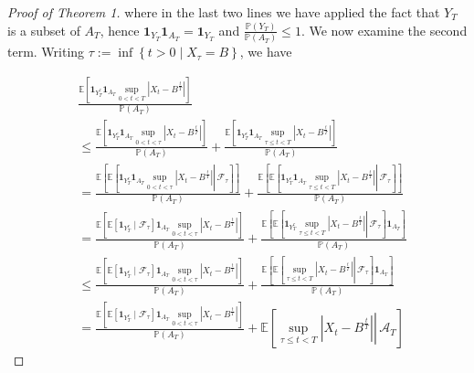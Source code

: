 \documentclass{article}
\theoremstyle{definition}
\theoremstyle{definition}
\begin{document}
\begin{proof}[Proof of Theorem 1]
where in the last two lines we have applied the fact that $Y_{T}$ is a subset of $A_{T}$, hence $\mathbf{1}_{Y_{T}} \mathbf{1}_{A_{T}}=\mathbf{1}_{Y_{T}}$ and $\frac{\mathbb{P}\left(Y_{T}\right)}{\mathbb{P}\left(A_{T}\right)} \leq 1$. We now examine the second term. Writing $\tau:=\inf \left\{t>0 \mid X_{\tau}=B\right\}$, we have

\begin{equation}\label{lol}\begin{aligned}
& \frac{\mathbb{E}\left[\mathbf{1}_{Y_{T}^{c}} \mathbf{1}_{A_{T}} \sup _{0<t<T}\left|X_{t}-B^{\frac{t}{T}}\right|\right]}{\mathbb{P}\left(A_{T}\right)} \\
& \leq \frac{\mathbb{E}\left[\mathbf{1}_{Y_{T}^{c}} \mathbf{1}_{A_{T}} \sup _{0<t<\tau}\left|X_{t}-B^{\frac{t}{T}}\right|\right]}{\mathbb{P}\left(A_{T}\right)}+\frac{\mathbb{E}\left[\mathbf{1}_{Y_{T}^{c}} \mathbf{1}_{A_{T}} \sup _{\tau \leq t<T}\left|X_{t}-B^{\frac{t}{T}}\right|\right]}{\mathbb{P}\left(A_{T}\right)} \\
& =\frac{\mathbb{E}\left[\mathbb{E}\left[\left.\mathbf{1}_{Y_{T}^{c}} \mathbf{1}_{A_{T}} \sup _{0<t<\tau}\left|X_{t}-B^{\frac{t}{T}}\right| \right\rvert\, \mathcal{F}_{\tau}\right]\right]}{\mathbb{P}\left(A_{T}\right)}+\frac{\mathbb{E}\left[\mathbb{E}\left[\left.\mathbf{1}_{Y_{T}^{c}} \mathbf{1}_{A_{T}} \sup _{\tau \leq t<T}\left|X_{t}-B^{\frac{t}{T}}\right| \right\rvert\, \mathcal{F}_{\tau}\right]\right]}{\mathbb{P}\left(A_{T}\right)} \\
& =\frac{\mathbb{E}\left[\mathbb{E}\left[\mathbf{1}_{Y_{T}^{c}} \mid \mathcal{F}_{\tau}\right] \mathbf{1}_{A_{T}} \sup _{0<t<\tau}\left|X_{t}-B^{\frac{t}{T}}\right|\right]}{\mathbb{P}\left(A_{T}\right)}+\frac{\mathbb{E}\left[\mathbb{E}\left[\left.\mathbf{1}_{Y_{T}^{c}} \sup _{\tau \leq t<T}\left|X_{t}-B^{\frac{t}{T}}\right| \right\rvert\, \mathcal{F}_{\tau}\right] \mathbf{1}_{A_{T}}\right]}{\mathbb{P}\left(A_{T}\right)} \\
& \leq \frac{\mathbb{E}\left[\mathbb{E}\left[\mathbf{1}_{Y_{T}^{c}} \mid \mathcal{F}_{\tau}\right] \mathbf{1}_{A_{T}} \sup _{0<t<\tau}\left|X_{t}-B^{\frac{t}{T}}\right|\right]}{\mathbb{P}\left(A_{T}\right)}+\frac{\mathbb{E}\left[\mathbb{E}\left[\left.\sup _{\tau \leq t<T}\left|X_{t}-B^{\frac{t}{T}}\right| \right\rvert\, \mathcal{F}_{\tau}\right] \mathbf{1}_{A_{T}}\right]}{\mathbb{P}\left(A_{T}\right)} \\
& =\frac{\mathbb{E}\left[\mathbb{E}\left[\mathbf{1}_{Y_{T}^{c}} \mid \mathcal{F}_{\tau}\right] \mathbf{1}_{A_{T}} \sup _{0<t<\tau}\left|X_{t}-B^{\frac{t}{T}}\right|\right]}{\mathbb{P}\left(A_{T}\right)}+\mathbb{E}\left[\left.\sup _{\tau \leq t<T}\left|X_{t}-B^{\frac{t}{T}}\right| \right\rvert\, \mathcal{A}_{T}\right]
\end{aligned}\end{equation}


\end{proof}
\end{document}
